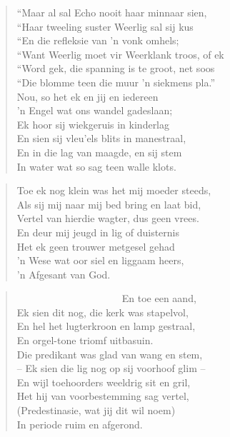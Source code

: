 \begin{verse}
``Maar al sal Echo nooit haar minnaar sien, \\ 
``Haar tweeling suster Weerlig sal sij kus \\ 
``En die refleksie van ’n vonk omhels; \\ 
``Want Weerlig moet vir Weerklank troos, of ek \\ 
``Word gek, die spanning is te groot, net soos \\ 
``Die blomme teen die muur ’n siekmens pla.'' \\ 
Nou, so het ek en jij en iedereen \\ 
’n Engel wat ons wandel gadeslaan; \\ 
Ek hoor sij wiekgeruis in kinderlag \\ 
En sien sij vleu’els blits in manestraal, \\ 
En in die lag van maagde, en sij stem \\ 
In water wat so sag teen walle klots. \\ 
\end{verse}

\begin{verse}
Toe ek nog klein was het mij moeder steeds, \\ 
Als sij mij naar mij bed bring en laat bid, \\ 
Vertel van hierdie wagter, dus geen vrees. \\ 
En deur mij jeugd in lig of duisternis \\ 
Het ek geen trouwer metgesel gehad \\ 
’n Wese wat oor siel en liggaam heers, \\ 
’n Afgesant van God. \\ 
\end{verse}

\begin{verse}
\ \ \ \ \ \ \ \ \ \ \ \ \ \ \ \ \ \ \ \ \ En toe een aand, \\
Ek sien dit nog, die kerk was stapelvol, \\ 
En hel het lugterkroon en lamp gestraal, \\ 
En orgel-tone triomf uitbasuin. \\ 
Die predikant was glad van wang en stem, \\ 
-- Ek sien die lig nog op sij voorhoof glim --  \\ 
En wijl toehoorders weeldrig sit en gril, \\ 
Het hij van voorbestemming sag vertel, \\ 
(Predestinasie, wat jij dit wil noem) \\ 
In periode ruim en afgerond. \\ 
\end{verse}

